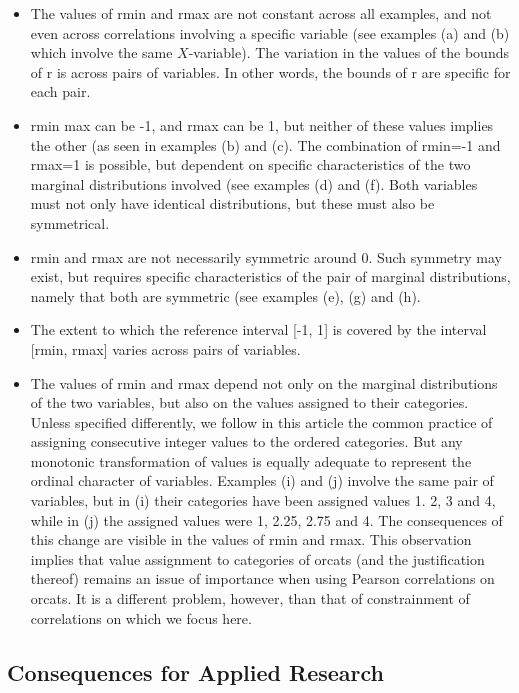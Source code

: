\documentclass[
  12pt,
]{article}
\providecommand{\tightlist}{%
  \setlength{\itemsep}{0pt}\setlength{\parskip}{0pt}}
\theoremstyle{plain}
\theoremstyle{definition}
\theoremstyle{remark}
\begin{document}
\begin{itemize}
\tightlist
\item
  The values of rmin and rmax are not constant across all examples, and
  not even across correlations involving a specific variable (see
  examples (a) and (b) which involve the same \(X\)-variable). The
  variation in the values of the bounds of r is across pairs of
  variables. In other words, the bounds of r are specific for each pair.
\item
  rmin max can be -1, and rmax can be 1, but neither of these values
  implies the other (as seen in examples (b) and (c). The combination of
  rmin=-1 and rmax=1 is possible, but dependent on specific
  characteristics of the two marginal distributions involved (see
  examples (d) and (f). Both variables must not only have identical
  distributions, but these must also be symmetrical.
\item
  rmin and rmax are not necessarily symmetric around 0. Such symmetry
  may exist, but requires specific characteristics of the pair of
  marginal distributions, namely that both are symmetric (see examples
  (e), (g) and (h).\\
\item
  The extent to which the reference interval {[}-1, 1{]} is covered by
  the interval {[}rmin, rmax{]} varies across pairs of variables.
\item
  The values of rmin and rmax depend not only on the marginal
  distributions of the two variables, but also on the values assigned to
  their categories. Unless specified differently, we follow in this
  article the common practice of assigning consecutive integer values to
  the ordered categories. But any monotonic transformation of values is
  equally adequate to represent the ordinal character of variables.
  Examples (i) and (j) involve the same pair of variables, but in (i)
  their categories have been assigned values 1. 2, 3 and 4, while in (j)
  the assigned values were 1, 2.25, 2.75 and 4. The consequences of this
  change are visible in the values of rmin and rmax. This observation
  implies that value assignment to categories of orcats (and the
  justification thereof) remains an issue of importance when using
  Pearson correlations on orcats. It is a different problem, however,
  than that of constrainment of correlations on which we focus here.
\end{itemize}

\subsection{Consequences for Applied
Research}\label{consequences-for-applied-research}
\end{document}
